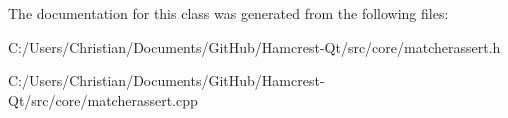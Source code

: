 The documentation for this class was generated from the following files\-:\begin{DoxyCompactItemize}
\item 
C\-:/\-Users/\-Christian/\-Documents/\-Git\-Hub/\-Hamcrest-\/\-Qt/src/core/matcherassert.\-h\item 
C\-:/\-Users/\-Christian/\-Documents/\-Git\-Hub/\-Hamcrest-\/\-Qt/src/core/matcherassert.\-cpp\end{DoxyCompactItemize}
